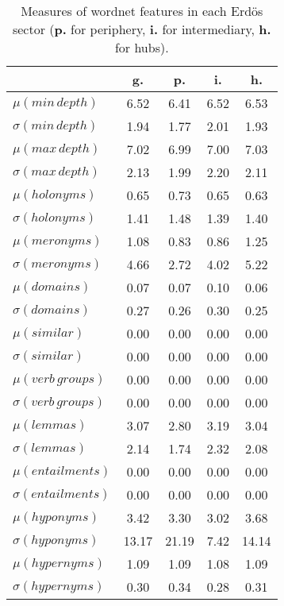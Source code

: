 \begin{table}[h!]
\begin{center}
\begin{tabular}{| l || c | c | c | c |}\hline
 & {\bf g.} & {\bf p.} & {\bf i.} & {\bf h.} \\\hline\hline
$\mu(min\,depth)$ & 6.52  & 6.41  & 6.52  & 6.53 \\
$\sigma(min\,depth)$ & 1.94  & 1.77  & 2.01  & 1.93 \\\hline
$\mu(max\,depth)$ & 7.02  & 6.99  & 7.00  & 7.03 \\
$\sigma(max\,depth)$ & 2.13  & 1.99  & 2.20  & 2.11 \\\hline
$\mu(holonyms)$ & 0.65  & 0.73  & 0.65  & 0.63 \\
$\sigma(holonyms)$ & 1.41  & 1.48  & 1.39  & 1.40 \\\hline
$\mu(meronyms)$ & 1.08  & 0.83  & 0.86  & 1.25 \\
$\sigma(meronyms)$ & 4.66  & 2.72  & 4.02  & 5.22 \\\hline
$\mu(domains)$ & 0.07  & 0.07  & 0.10  & 0.06 \\
$\sigma(domains)$ & 0.27  & 0.26  & 0.30  & 0.25 \\\hline
$\mu(similar)$ & 0.00  & 0.00  & 0.00  & 0.00 \\
$\sigma(similar)$ & 0.00  & 0.00  & 0.00  & 0.00 \\\hline
$\mu(verb\,groups)$ & 0.00  & 0.00  & 0.00  & 0.00 \\
$\sigma(verb\,groups)$ & 0.00  & 0.00  & 0.00  & 0.00 \\\hline
$\mu(lemmas)$ & 3.07  & 2.80  & 3.19  & 3.04 \\
$\sigma(lemmas)$ & 2.14  & 1.74  & 2.32  & 2.08 \\\hline
$\mu(entailments)$ & 0.00  & 0.00  & 0.00  & 0.00 \\
$\sigma(entailments)$ & 0.00  & 0.00  & 0.00  & 0.00 \\\hline
$\mu(hyponyms)$ & 3.42  & 3.30  & 3.02  & 3.68 \\
$\sigma(hyponyms)$ & 13.17  & 21.19  & 7.42  & 14.14 \\\hline
$\mu(hypernyms)$ & 1.09  & 1.09  & 1.08  & 1.09 \\
$\sigma(hypernyms)$ & 0.30  & 0.34  & 0.28  & 0.31 \\\hline
\end{tabular}
\caption{Measures of wordnet features in each Erd\"os sector ({{\bf p.}} for periphery, {{\bf i.}} for intermediary, {{\bf h.}} for hubs).}
\end{center}
\end{table}